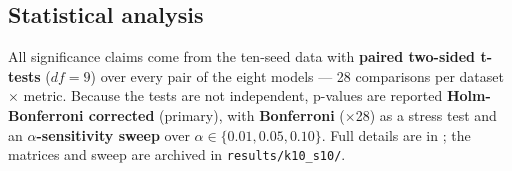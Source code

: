 \subsection{Statistical analysis}
\label{sec:datasets-stats}

All significance claims come from the ten-seed data with \textbf{paired two-sided t-tests} ($df = 9$) over every pair of the eight models --- 28 comparisons per dataset $\times$ metric. Because the tests are not independent, p-values are reported \textbf{Holm-Bonferroni corrected} (primary), with \textbf{Bonferroni} ($\times$28) as a stress test and an \textbf{$\alpha$-sensitivity sweep} over $\alpha \in \{0.01, 0.05, 0.10\}$. Full details are in ; the matrices and sweep are archived in \texttt{results/k10\_s10/}.


%
%
